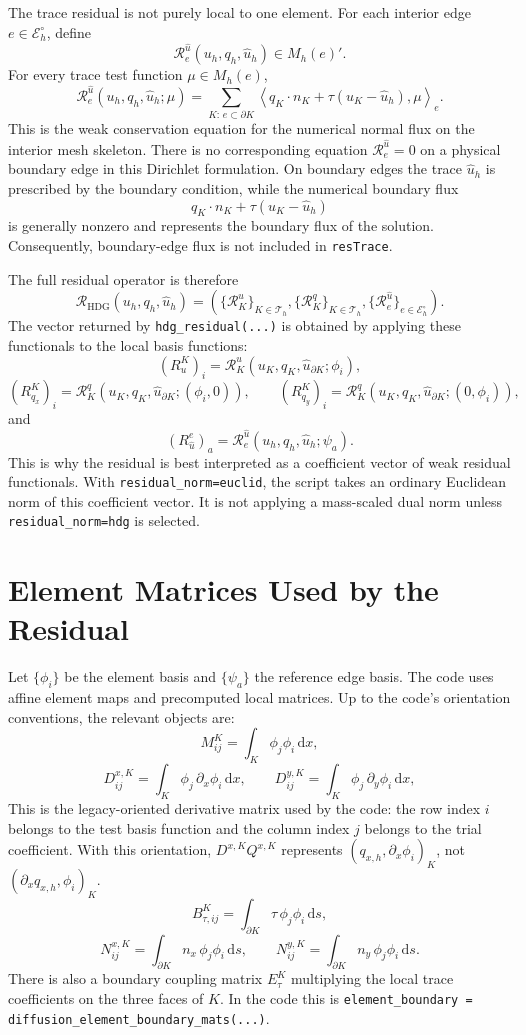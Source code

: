 \documentclass[11pt]{article}
\newcommand{\Th}{\mathcal T_h}
\newcommand{\Ehi}{\mathcal E_h^\circ}
\newcommand{\R}{\mathcal R}
\newcommand{\Mh}{M_h}
\newcommand{\dd}{\,\mathrm d}
\begin{document}
The trace residual is not purely local to one element.  For each
interior edge \(e\in\Ehi\), define
\[
  \R^{\widehat u}_e(u_h,q_h,\widehat u_h)\in \Mh(e)'.
\]
For every trace test function \(\mu\in\Mh(e)\),
\[
  \boxed{
  \R^{\widehat u}_e(u_h,q_h,\widehat u_h;\mu)
  =
  \sum_{K:\,e\subset\partial K}
  \left\langle
    q_K\cdot n_K+\tau(u_K-\widehat u_h),
    \mu
  \right\rangle_e .
  }
\]
This is the weak conservation equation for the numerical normal flux on
the interior mesh skeleton.  There is no corresponding equation
\(\R^{\widehat u}_e=0\) on a physical boundary edge in this Dirichlet
formulation.  On boundary edges the trace \(\widehat u_h\) is prescribed
by the boundary condition, while the numerical boundary flux
\[
  q_K\cdot n_K+\tau(u_K-\widehat u_h)
\]
is generally nonzero and represents the boundary flux of the solution.
Consequently, boundary-edge flux is not included in \texttt{resTrace}.

The full residual operator is therefore
\[
  \R_{\mathrm{HDG}}(u_h,q_h,\widehat u_h)
  =
  \left(
    \{\R^u_K\}_{K\in\Th},
    \{\R^q_K\}_{K\in\Th},
    \{\R^{\widehat u}_e\}_{e\in\Ehi}
  \right).
\]
The vector returned by \texttt{hdg\_residual(...)} is obtained by
applying these functionals to the local basis functions:
\[
  (R^K_u)_i
  =
  \R^u_K(u_K,q_K,\widehat u_{\partial K};\phi_i),
\]
\[
  (R^K_{q_x})_i
  =
  \R^q_K(u_K,q_K,\widehat u_{\partial K};(\phi_i,0)),
  \qquad
  (R^K_{q_y})_i
  =
  \R^q_K(u_K,q_K,\widehat u_{\partial K};(0,\phi_i)),
\]
and
\[
  (R^e_{\widehat u})_a
  =
  \R^{\widehat u}_e(u_h,q_h,\widehat u_h;\psi_a).
\]
This is why the residual is best interpreted as a coefficient vector of
weak residual functionals.  With \texttt{residual\_norm=euclid}, the
script takes an ordinary Euclidean norm of this coefficient vector.  It
is not applying a mass-scaled dual norm unless \texttt{residual\_norm=hdg}
is selected.

\section{Element Matrices Used by the Residual}

Let \(\{\phi_i\}\) be the element basis and \(\{\psi_a\}\) the reference
edge basis.  The code uses affine element maps and precomputed local
matrices.  Up to the code's orientation conventions, the relevant
objects are:
\[
  M^K_{ij} = \int_K \phi_j\phi_i \dd x,
\]
\[
  D^{x,K}_{ij} = \int_K \phi_j\,\partial_x\phi_i \dd x,
  \qquad
  D^{y,K}_{ij} = \int_K \phi_j\,\partial_y\phi_i \dd x,
\]
This is the legacy-oriented derivative matrix used by the code: the
row index \(i\) belongs to the test basis function and the column index
\(j\) belongs to the trial coefficient.  With this orientation,
\(D^{x,K}Q^{x,K}\) represents \((q_{x,h},\partial_x\phi_i)_K\), not
\((\partial_x q_{x,h},\phi_i)_K\).
\[
  B^K_{\tau,ij}
  =
  \int_{\partial K} \tau\,\phi_j\phi_i \dd s,
\]
\[
  N^{x,K}_{ij}
  =
  \int_{\partial K} n_x\,\phi_j\phi_i \dd s,
  \qquad
  N^{y,K}_{ij}
  =
  \int_{\partial K} n_y\,\phi_j\phi_i \dd s.
\]
There is also a boundary coupling matrix \(E^K_\tau\) multiplying the
local trace coefficients on the three faces of \(K\).  In the code this
is \texttt{element\_boundary = diffusion\_element\_boundary\_mats(...)}.
\end{document}
